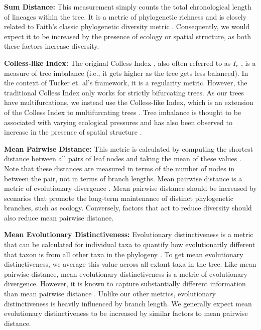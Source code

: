 \textbf{Sum Distance:} This measurement simply counts the total chronological length of lineages within the tree.
It is a metric of phylogenetic richness and is closely related to Faith's classic phylogenetic diversity metric \citep{faithConservationEvaluationPhylogenetic1992}.
Consequently, we would expect it to be increased by the presence of ecology or spatial structure, as both these factors increase diversity.

\textbf{Colless-like Index:}
The original Colless Index \citep{collessReviewPhylogeneticsTheory1982}, also often referred to as $I_c$ \citep{shaoTreeBalance1990}, is a measure of tree imbalance (i.e., it gets higher as the tree gets less balanced).
In the context of Tucker et. al's framework, it is a regularity metric.
However, the traditional Colless Index only works for strictly bifurcating trees.
As our trees have multifurcations, we instead use the Colless-like Index, which is an extension of the Colless Index to multifurcating trees \citep{mirSoundCollesslikeBalance2018}.
Tree imbalance is thought to be associated with varying ecological pressures \citep{chamberlainPhylogeneticTreeShape2014, burressEcologicalOpportunityAlters} and has also been observed to increase in the presence of spatial structure \citep{scottInferringTumorProliferative2020}.

\textbf{Mean Pairwise Distance:}
This metric is calculated by computing the shortest distance between all pairs of leaf nodes and taking the mean of these values \citep{webbExploringPhylogeneticStructure2000}.
Note that these distances are measured in terms of the number of nodes in between the pair, not in terms of branch lengths.
Mean pairwise distance is a metric of evolutionary divergence \citep{tuckerGuidePhylogeneticMetrics2017}.
Mean pairwise distance should be increased by scenarios that promote the long-term maintenance of distinct phylogenetic branches, such as ecology.
Conversely, factors that act to reduce diversity should also reduce mean pairwise distance.

\textbf{Mean Evolutionary Distinctiveness:}
Evolutionary distinctiveness is a metric that can be calculated for individual taxa to quantify how evolutionarily different that taxon is from all other taxa in the phylogeny \citep{isaacMammalsEDGEConservation2007}.
To get mean evolutionary distinctiveness, we average this value across all extant taxa in the tree.
Like mean pairwise distance, mean evolutionary distinctiveness is a metric of evolutionary divergence.
However, it is known to capture substantially different information than mean pairwise distance \citep{tuckerGuidePhylogeneticMetrics2017}.
Unlike our other metrics, evolutionary distinctiveness is heavily influenced by branch length.
We generally expect mean evolutionary distinctiveness to be increased by similar factors to mean pairwise distance.


